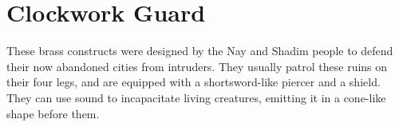 \section{Clockwork Guard}

These brass constructs were designed by the Nay and Shadim people to defend their now abandoned cities from intruders. They usually patrol these ruins on their four legs, and are equipped with a shortsword-like piercer and a shield. They can use sound to incapacitate living creatures, emitting it in a cone-like shape before them.